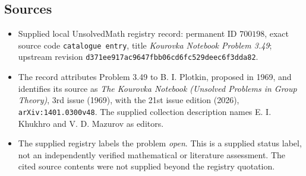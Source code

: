\documentclass[11pt]{article}
\begin{document}
\subsection{Sources}
\begin{itemize}
\item Supplied local UnsolvedMath registry record: permanent ID \(700198\), exact source code \texttt{catalogue entry}, title \emph{Kourovka Notebook Problem 3.49}; upstream revision \texttt{d371ee917ac9647fbb06cd6fc529deec6f3dda82}.
\item The record attributes Problem 3.49 to B. I. Plotkin, proposed in 1969, and identifies its source as \emph{The Kourovka Notebook (Unsolved Problems in Group Theory)}, 3rd issue (1969), with the 21st issue edition (2026), \texttt{arXiv:1401.0300v48}. The supplied collection description names E. I. Khukhro and V. D. Mazurov as editors.
\item The supplied registry labels the problem \emph{open}. This is a supplied status label, not an independently verified mathematical or literature assessment. The cited source contents were not supplied beyond the registry quotation.
\end{itemize}
\end{document}
